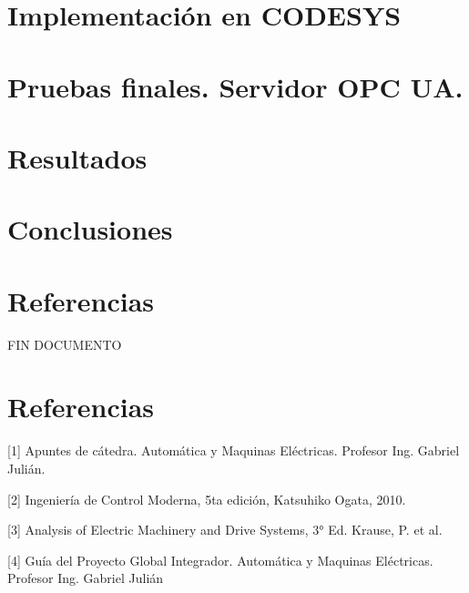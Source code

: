 \documentclass[11pt]{article}
\begin{document}
\section{Implementación en CODESYS}
\section{Pruebas finales. Servidor OPC UA.}
\section{Resultados}
\section{Conclusiones}
\section{Referencias}










\newpage
FIN DOCUMENTO
\newpage






\section{Referencias}

[1] Apuntes de cátedra. Automática y Maquinas Eléctricas. Profesor Ing. Gabriel Julián.

[2] Ingeniería de Control Moderna, 5ta edición, Katsuhiko Ogata, 2010.

[3] Analysis of Electric Machinery and Drive Systems, 3° Ed. Krause, P. et al.

[4] Guía del Proyecto Global Integrador. Automática y Maquinas Eléctricas. Profesor Ing. Gabriel Julián
\end{document}
